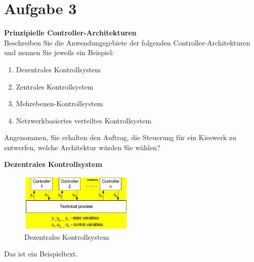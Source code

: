 \documentclass[12pt,a4paper,ngerman]{article}
\begin{document}
\pagebreak


\section{Aufgabe 3}
\begin{framed}
\textbf{Prinzipielle Controller-Architekturen} \\
Beschreiben Sie die Anwendungsgebiete der folgenden Controller-Architekturen und nennen Sie jeweils ein Beispiel:
\begin{enumerate}
\item Dezentrales Kontrollsystem
\item Zentrales Kontrollsystem
\item Mehrebenen-Kontrollsystem
\item Netzwerkbasiertes verteiltes Kontrollsystem
\end{enumerate}
Angenommen, Sie erhalten den Auftrag, die Steuerung für ein Kieswerk zu entwerfen, welche Architektur würden Sie wählen?
\end{framed}

\textbf{Dezentrales Kontrollsystem}
\\

\begin{figure}
\vspace{-20pt}
  \begin{center}
    \includegraphics[width=0.48\textwidth]{figures/dezentral.pdf}
  \end{center}
  \caption{Dezentrales Kontrollsystem}
\vspace{-10pt}
\end{figure}
Das ist ein Beispieltext. 
\vspace{0.5cm}
\end{document}
